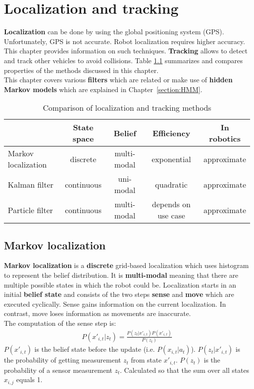 \documentclass{report}
\begin{document}
\chapter{Localization and tracking}
\label{chapter:localizationandtracking}
{\bf Localization} can be done by using the global positioning system (GPS). Unfortunately, GPS is not accurate. Robot localization requires higher accuracy. This chapter provides information on such techniques.
{\bf Tracking} allows to detect and track other vehicles to avoid collisions.
Table \ref{ref:complocalization} summarizes and compares properties of the methods discussed in this chapter. \\
This chapter covers various {\bf filters} which are related or make use of {\bf hidden Markov models} which are explained in Chapter~\ref{section:HMM}.
\begin{table}[h!]
\begin{center}
\begin{tabular}{l||c|c|c|c}
 & State space & Belief & Efficiency & In robotics \\
\hline
\hline
Markov localization & discrete & multi-modal & exponential & approximate \\
\hline
Kalman filter & continuous & uni-modal & quadratic & approximate \\
\hline
Particle filter & continuous & multi-modal & depends on use case & approximate \\

\end{tabular}
\end{center}
\caption{Comparison of localization and tracking methods}
\label{ref:complocalization}
\end{table}

\section{Markov localization}
{\bf Markov localization} is a {\bf discrete} grid-based localization which uses histogram to represent the belief distribution. It is {\bf multi-modal} meaning that there are multiple possible states in which the robot could be. Localization starts in an initial {\bf belief state} and consists of the two steps {\bf sense} and {\bf move} which are executed cyclically. Sense gains information on the current localization. In contrast, move loses information as movements are inaccurate. \\
The computation of the sense step is: \\
\begin{align*}
P(x'_{i,t}\vert z_t) = \frac{P(z_t\vert x'_{i,t})P(x'_{i,t})}{P(z_t)}
\end{align*}
$P(x'_{i,t})$ is the belief state before the update (i.e. $P(x_{i,t}\vert a_t)$). $P(z_t\vert x'_{i,t})$ is the probability of getting measurement $z_t$ from state $x'_{i,t}$. $P(z_t)$ is the probability of a sensor measurement $z_t$. Calculated so that the sum over all states $x_{i,j}$ equals 1.
\end{document}
